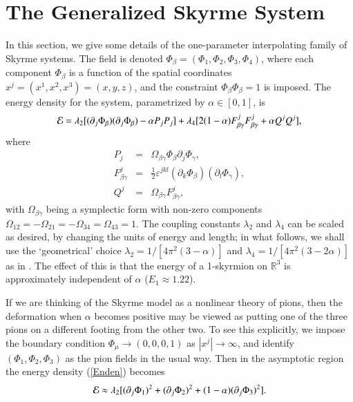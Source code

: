 \documentclass[5p]{elsarticle}
\newcommand{\pa}{\partial}
\newcommand{\ve}{\varepsilon}
\newcommand{\RR}{\mathbb R}
\newcommand{\half}{\textstyle\frac{1}{2}}
\begin{document}

\section{The Generalized Skyrme System}

In this section, we give some details of the one-parameter interpolating
family of Skyrme systems. The field is denoted
$\Phi_{\beta}=(\Phi_1,\Phi_2,\Phi_3,\Phi_4)$, where
each component $\Phi_{\beta}$ is a function of the spatial coordinates
$x^j=(x^1,x^2,x^3)=(x,y,z)$, and the constraint $\Phi_{\beta}\Phi_{\beta}=1$
is imposed. The energy density for the system, parametrized by
$\alpha\in[0,1]$, is
%
\begin{equation} \label{Enden}
  {\cal E}=\lambda_2[(\pa_j\Phi_{\beta})(\pa_j\Phi_{\beta})-\alpha P_jP_j]
  +\lambda_4[2(1-\alpha)F^j_{\beta\gamma}F^j_{\beta\gamma}+\alpha Q^jQ^j],
\end{equation}
%
where
%
\begin{eqnarray*}
P_j &=& \Omega_{\beta\gamma}\Phi_{\beta}\pa_j\Phi_{\gamma},  \\
F^j_{\beta\gamma} &=&
    \half\ve^{jkl}(\pa_k\Phi_{\beta})(\pa_l\Phi_{\gamma}),  \\
Q^j &=& \Omega_{\beta\gamma}F^j_{\beta\gamma},
\end{eqnarray*}
%
with $\Omega_{\beta\gamma}$ being a symplectic form with non-zero
components $\Omega_{12}=-\Omega_{21}=-\Omega_{34}=\Omega_{43}=1$.
The coupling constants $\lambda_2$ and $\lambda_4$
can be scaled as desired, by changing the units of energy and length;
in what follows, we shall use the `geometrical' choice
$\lambda_2=1/[4\pi^2(3-\alpha)]$ and $\lambda_4=1/[4\pi^2(3-2\alpha)]$
as in \cite{W04}. The effect of this is that the energy of a 1-skyrmion
on $\RR^3$ is approximately independent of $\alpha$ ($E_1\approx1.22$).

If we are thinking of the Skyrme model as a nonlinear theory of pions,
then the deformation when $\alpha$ becomes positive may be viewed as
putting one of the three
pions on a different footing from the other two. To see this explicitly,
we impose the boundary condition $\Phi_{\mu}\to(0,0,0,1)$ as $|x^j|\to \infty$,
and identify $(\Phi_1,\Phi_2,\Phi_3)$ as the pion fields in the usual way.
Then in the asymptotic region the energy density (\ref{Enden}) becomes
%
\begin{equation} \label{Enden_asymp}
  {\cal E}\approx\lambda_2[(\pa_j\Phi_1)^2+(\pa_j\Phi_2)^2+(1-\alpha)(\pa_j\Phi_3)^2].
\end{equation}
%
\end{document}
